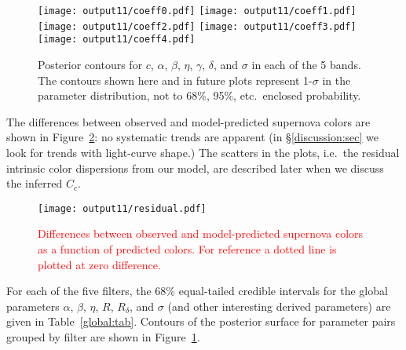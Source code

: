 \documentclass{aastex}   	%
\begin{document}
\begin{figure}[htbp] %
   \centering
   \texttt{[image: output11/coeff0.pdf]} 
   \texttt{[image: output11/coeff1.pdf]} 
   \texttt{[image: output11/coeff2.pdf]} 
      \texttt{[image: output11/coeff3.pdf]} 
         \texttt{[image: output11/coeff4.pdf]} 
            \caption{Posterior contours for $c$, $\alpha$, $\beta$, $\eta$, $\gamma$, $\delta$, and $\sigma$ in each of the 5 bands.
            The contours shown here and in future plots represent 1-$\sigma$ in the parameter distribution, not to 68\%, 95\%, etc.\
            enclosed probability.  \label{global:fig}}
\end{figure}

\color{red}

The differences between observed and model-predicted supernova colors are shown in Figure~\ref{residual:fig}:
no systematic trends are apparent (in \S\ref{discussion:sec} we look for trends with light-curve shape.) 
The scatters in the plots, i.e.\ the residual intrinsic color dispersions from our model, are described
later when we discuss the inferred $C_c$.
\begin{figure}[htbp] %
   \centering
   \texttt{[image: output11/residual.pdf]} 
            \caption{\textcolor{red}{Differences between observed and  model-predicted supernova colors  as a function
            of predicted colors.  For reference a dotted line is plotted at zero difference.}
            \label{residual:fig}}
\end{figure}

\color{black}

For each of the five filters, the 68\%  equal-tailed credible intervals for the global parameters $\alpha$, $\beta$, $\eta$, $R$, $R_\delta$, and $\sigma$
(and other interesting derived parameters)
are given in Table~\ref{global:tab}.
Contours of the posterior surface for parameter pairs grouped by filter are shown in Figure~\ref{global:fig}.
\end{document}
